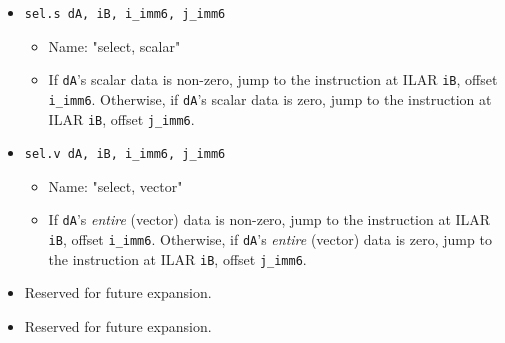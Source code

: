 \documentclass{article}
\begin{document}
\begin{itemize}
			\item \texttt{sel.s dA, iB, i\_imm6, j\_imm6}
				\begin{itemize}
				\item Name:  "select, scalar"
				\item If \texttt{dA}'s scalar data is non-zero, jump to the
					instruction at ILAR \texttt{iB}, offset
					\texttt{i\_imm6}.  Otherwise, if \texttt{dA}'s scalar
					data is zero, jump to the instruction at ILAR
					\texttt{iB}, offset \texttt{j\_imm6}.
				\end{itemize}

			\item \texttt{sel.v dA, iB, i\_imm6, j\_imm6}
				\begin{itemize}
				\item Name:  "select, vector"
				\item If \texttt{dA}'s \textit{entire} (vector) data is
					non-zero, jump to the instruction at ILAR \texttt{iB},
					offset \texttt{i\_imm6}.  Otherwise, if \texttt{dA}'s
					\textit{entire} (vector) data is zero, jump to the
					instruction at ILAR \texttt{iB}, offset
					\texttt{j\_imm6}.
				\end{itemize}

			\item Reserved for future expansion.
			\item Reserved for future expansion.
		\end{itemize}


\end{document}
